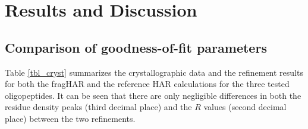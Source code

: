 \documentclass[preprint,dvipsnames]{iucr}              %
\begin{document}
\section{Results and Discussion}
\label{sec_results}

\subsection{Comparison of goodness-of-fit parameters}

Table \ref{tbl_cryst} summarizes the crystallographic data and the
refinement results for both the fragHAR and the reference HAR calculations 
for the three tested oligopeptides. It can be seen that there are only 
negligible differences in both the residue density peaks 
(third decimal place) and the $R$ values (second decimal place)
between the two refinements. 
\end{document}
